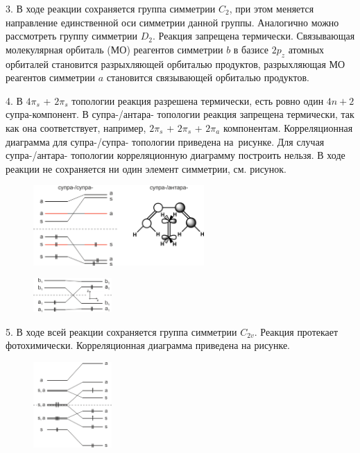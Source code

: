 3. В ходе реакции сохраняется группа симметрии $C_2$, при этом меняется направление единственной оси симметрии данной группы. Аналогично можно рассмотреть группу симметрии $D_2$. Реакция запрещена термически. Связывающая молекулярная орбиталь (МО) реагентов симметрии $b$ в базисе $2p_z$ атомных орбиталей становится разрыхляющей орбиталью продуктов, разрыхляющая МО реагентов симметрии $a$ становится связывающей орбиталью продуктов.\par
4. В $4\pi_s$ + $2\pi_s$ топологии реакция разрешена термически, есть ровно один $4n+2$ супра-компонент. В супра-/антара- топологии реакция запрещена термически, так как она соответствует, например, $2\pi_s$ + $2\pi_s$ + $2\pi_a$ компонентам. Корреляционная диаграмма для супра-/супра- топологии приведена на~рисунке. Для случая супра-/антара- топологии корреляционную диаграмму построить нельзя. В ходе реакции не сохраняется ни один элемент симметрии, см. рисунок.\par
\vspace{-\parskip}
\vspace{1mm}
\begin{figure}[h]
\includegraphics[width=6.5cm]{images/Fig_2_1_4_dec.png}
\centering
\end{figure}
\vspace{-\parskip}
\par
\begin{figure} %
    \centering
    \vspace{-0.7mm}
    \includegraphics[width=30mm]{images/Fig_2_1_5_dec.png}
    \vspace{-9mm}
\end{figure}
5. В ходе всей реакции сохраняется группа симметрии  $C_{2v}$. Реакция протекает фотохимически. Корреляционная диаграмма приведена на рисунке.\par
\begin{figure} %
    \centering
    \vspace{5.4mm}
    \includegraphics[width=30mm]{images/Fig_2_1_6_dec.png}
    \vspace{-5mm}
\end{figure}
